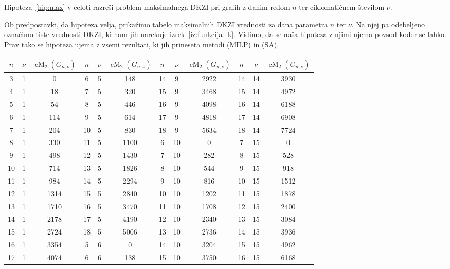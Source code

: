 \documentclass[fin1, tisk]{fmfdelo}
\newcommand{\cM}{\operatorname{cM}_2}
\begin{document}
\begin{opomba}
  Hipoteza~\ref{hip:max} v celoti razreši problem maksimalnega DKZI pri grafih 
  z danim redom $n$ ter ciklomatičnem številom $\nu$.
\end{opomba}
Ob predpostavki, da hipoteza velja, prikažimo tabelo maksimalnih DKZI vrednosti za dana 
parametra $n$ ter $\nu$. Na njej pa odebeljeno označimo tiste vrednosti DKZI, ki 
nam jih narekuje izrek~\ref{iz:funkcija_k}. Vidimo, da se naša hipoteza z njimi ujema
povsod koder se lahko. Prav tako se hipoteza ujema z vsemi rezultati, ki jih 
prineseta metodi (MILP) in (SA).
\newpage
{\scriptsize
\begin{center}
\begin{tabular}{|c|c|c||c|c|c||c|c|c||c|c|c|}
\hline
$n$ & $\nu$ & $\cM(G_{n, \nu})$ & $n$ & $\nu$ & $\cM(G_{n, \nu})$ & $n$ & $\nu$ & $\cM(G_{n, \nu})$ & $n$ & $\nu$ & $\cM(G_{n, \nu})$\\ \hline
3 & 1 & 0 & 6 & 5 & 148 & 14 & 9 & 2922 & 14 & 14 & 3930\\ \hline
4 & 1 & 18 & 7 & 5 & 320 & 15 & 9 & 3468 & 15 & 14 & 4972\\ \hline
5 & 1 & 54 & 8 & 5 & 446 & 16 & 9 & 4098 & 16 & 14 & 6188\\ \hline
6 & 1 & 114 & 9 & 5 & 614 & 17 & 9 & 4818 & 17 & 14 & 6908\\ \hline
7 & 1 & 204 & 10 & 5 & 830 & 18 & 9 & 5634 & 18 & 14 & 7724\\ \hline
8 & 1 & 330 & 11 & 5 & 1100 & 6 & 10 & 0 & 7 & 15 & 0\\ \hline
9 & 1 & 498 & 12 & 5 & 1430 & 7 & 10 & 282 & 8 & 15 & 528\\ \hline
10 & 1 & 714 & 13 & 5 & 1826 & 8 & 10 & 544 & 9 & 15 & 918\\ \hline
11 & 1 & 984 & 14 & 5 & 2294 & 9 & 10 & 816 & 10 & 15 & 1512\\ \hline
12 & 1 & 1314 & 15 & 5 & 2840 & 10 & 10 & 1202 & 11 & 15 & 1878\\ \hline
13 & 1 & 1710 & 16 & 5 & 3470 & 11 & 10 & 1708 & 12 & 15 & 2400\\ \hline
14 & 1 & 2178 & 17 & 5 & 4190 & 12 & 10 & 2340 & 13 & 15 & 3084\\ \hline
15 & 1 & 2724 & 18 & 5 & 5006 & 13 & 10 & 2736 & 14 & 15 & 3936\\ \hline
16 & 1 & 3354 & 5 & 6 & 0 & 14 & 10 & 3204 & 15 & 15 & 4962\\ \hline
17 & 1 & 4074 & 6 & 6 & 138 & 15 & 10 & 3750 & 16 & 15 & 6168\\ \hline

\end{tabular}
\end{center}}
\end{document}
